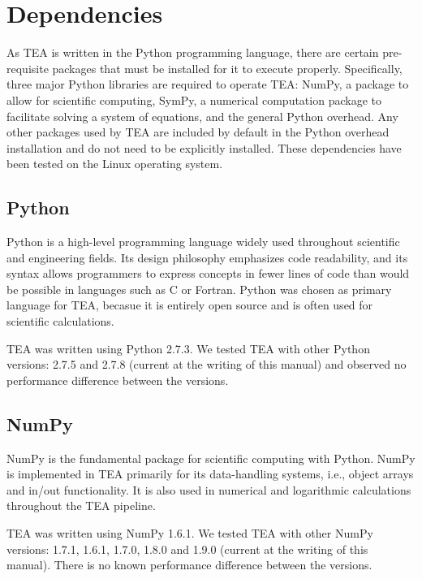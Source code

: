 \section{Dependencies} 
\label{depen}
  As TEA is written in the Python programming language, there are
  certain pre-requisite packages that must be installed for it to
  execute properly.  Specifically, three major Python libraries are
  required to operate TEA: NumPy, a package to allow for scientific
  computing, SymPy, a numerical computation package to facilitate
  solving a system of equations, and the general Python overhead.  Any
  other packages used by TEA are included by default in the Python
  overhead installation and do not need to be explicitly installed.
  These dependencies have been tested on the Linux operating system.
  
\subsection{Python}
\label{python}
  Python is a high-level programming language widely used throughout
  scientific and engineering fields.  Its design philosophy emphasizes
  code readability, and its syntax allows programmers to express
  concepts in fewer lines of code than would be possible in languages
  such as C or Fortran.  Python was chosen as primary language for
  TEA, becasue it is entirely open source and is often used for
  scientific calculations.


  TEA was written using Python 2.7.3. We tested TEA with other Python
  versions: 2.7.5 and 2.7.8 (current at the writing of this manual)
  and observed no performance difference between the versions.


\subsection{NumPy}
\label{numpy}
  NumPy is the fundamental package for scientific computing with
  Python. NumPy is implemented in TEA primarily for its data-handling
  systems, i.e., object arrays and in/out functionality.  It is also
  used in numerical and logarithmic calculations throughout the TEA
  pipeline.
  

 TEA was written using NumPy 1.6.1. We tested TEA with other NumPy
 versions: 1.7.1, 1.6.1, 1.7.0, 1.8.0 and 1.9.0 (current at the
 writing of this manual). There is no known performance difference
 between the versions.


